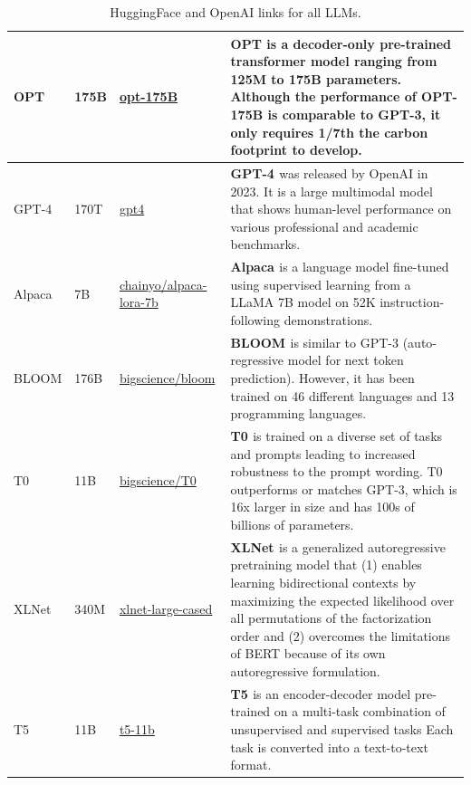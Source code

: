 \begin{table}[!htp]
\begin{tabular}{p{1cm}|p{1.1cm}|p{3cm}|p{8.9cm}}
OPT &175B &\href{https://github.com/facebookresearch/metaseq/tree/main/projects/OPT}{opt-175B} & \textbf{OPT \cite{zhang2022opt}} is a decoder-only pre-trained transformer model ranging from 125M to 175B parameters.  Although the performance of OPT-175B is comparable to GPT-3, it only requires 1/7th the carbon footprint to develop.\\ \midrule
GPT-4 &170T & \href{https://openai.com/research/gpt-4}{gpt4} & \textbf{GPT-4 \cite{openai2023gpt4}} was released by OpenAI in 2023. It is a large multimodal model that shows human-level performance on various professional and academic benchmarks. \\  \midrule
Alpaca &7B &\href{https://huggingface.co/chainyo/alpaca-lora-7b}{chainyo/alpaca-lora-7b} & \textbf{Alpaca \cite{alpaca}}  is a language model fine-tuned using supervised learning from a LLaMA 7B model on 52K instruction-following demonstrations.\\ \midrule
BLOOM &176B &\href{https://huggingface.co/bigscience/bloom}{bigscience/bloom} & \textbf{BLOOM \cite{scao2022bloom}} is similar to GPT-3 (auto-regressive model for next token prediction). However, it has been trained on 46 different languages and 13 programming languages.\\ \midrule
T0 &11B &\href{https://huggingface.co/bigscience/T0}{bigscience/T0} & \textbf{T0 \cite{DBLP:conf/iclr/DeleuKFKBLB22}} is trained on a diverse set of tasks and prompts leading to increased robustness to the prompt wording. T0 outperforms or matches GPT-3, which is 16x larger in size and has 100s of billions of parameters.\\ \midrule
XLNet &340M &\href{https://huggingface.co/xlnet-large-cased}{xlnet-large-cased} & \textbf{XLNet \cite{yang2019xlnet}} is a generalized autoregressive pretraining model that (1) enables learning bidirectional contexts by maximizing the expected likelihood over all permutations of the factorization order and (2) overcomes the limitations of BERT because of its own autoregressive formulation. \\ \midrule
T5 &11B &\href{https://huggingface.co/t5-11b}{t5-11b} & \textbf{T5 \cite{raffel2020exploring}} is an encoder-decoder model pre-trained on a multi-task combination of unsupervised and supervised tasks Each task is converted into a text-to-text format. \\ 


\bottomrule
\end{tabular}

\caption{HuggingFace and OpenAI links for all LLMs.}
\label{tab:hf-links}
\end{table}


